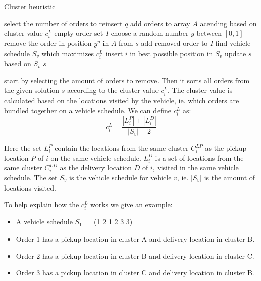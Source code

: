 \documentclass[../main.tex]{subfiles}
\begin{document}
\begin{algorithm}
    \caption{Cluster heuristic}\label{alg:cluster}
    \begin{algorithmic}[1]
        \State select the number of orders to reinsert $q$
        \State add orders to array $A$ acending based on cluster value $c^L_i$
        \State empty order set $I$
        \Repeat
            \State choose a random number $y$ between $[0,1]$
            \State remove the order in position $y^p$ in $A$ from $s$ 
            \State add removed order to $I$
            \State find vehicle schedule $S_v$ which maximizes $c^L_i$
            \State insert $i$ in best possible position in $S_v$
            \State update $s$ based on $S_v$
        \EndFor
        \State
        \Return $s$
        \EndFunction
    \end{algorithmic}
\end{algorithm}

 start by selecting the amount of orders to remove. 
Then it sorts all orders from the given solution $s$ according to the cluster value $c^L_i$. 
The cluster value is calculated based on the locations visited by the vehicle, ie. which orders are bundled together on a vehicle schedule.
We can define $c^L_i$ as:
\begin{equation}
    c^L_i = \dfrac{|L^P_{i}|+|L^D_{i}|}{|S_v|-2}
\end{equation}

Here the set $L^P_{i}$ contain the locations from the same cluster $C^{LP}_i$ as the pickup location $P$ of $i$ on the same vehicle schedule. 
$L^D_{i}$ is a set of locations from the same cluster $C^{LD}_i$ as the delivery location $D$ of $i$, visited in the same vehicle schedule.
The set $S_v$ is the vehicle schedule for vehicle $v$, ie. $|S_v|$ is the amount of locations visited. \par

To help explain how the $c^L_i$ works we give an example:
\begin{itemize}
    \item A vehicle schedule $S_1 =$ (1 2 1 2 3 3) 
    \item Order 1 has a pickup location in cluster A and delivery location in cluster B.
    \item Order 2 has a pickup location in cluster B and delivery location in cluster C.
    \item Order 3 has a pickup location in cluster C and delivery location in cluster B.
\end{itemize}
\end{document}

